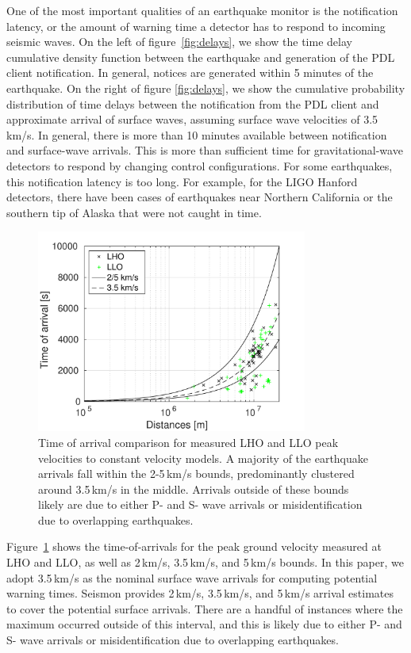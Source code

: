 \documentclass[twocolumn, aps, superscriptaddress]{revtex4}
\begin{document}
One of the most important qualities of an earthquake monitor is the notification latency, or the amount of warning time a detector has to respond to incoming seismic waves. On the left of figure~\ref{fig:delays}, we show the time delay cumulative density function between the earthquake and generation of the PDL client notification. In general, notices are generated within 5 minutes of the earthquake. On the right of figure \ref{fig:delays}, we show the cumulative probability distribution of time delays between the notification from the PDL client and approximate arrival of surface waves, assuming surface wave velocities of 3.5\,km/s. In general, there is more than 10 minutes available between notification and surface-wave arrivals. This is more than sufficient time for gravitational-wave detectors to respond by changing control configurations. For some earthquakes, this notification latency is too long. For example, for the LIGO Hanford detectors, there have been cases of earthquakes near Northern California or the southern tip of Alaska that were not caught in time.

\begin{figure}[t]
\hspace*{-0.5cm}
 \includegraphics[width=3.5in]{TOA.pdf}
 \caption{Time of arrival comparison for measured LHO and LLO peak velocities to constant velocity models. A majority of the earthquake arrivals fall within the 2-5\,km/s bounds, predominantly clustered around 3.5\,km/s in the middle. Arrivals outside of these bounds likely are due to either P- and S- wave arrivals or misidentification due to overlapping earthquakes.}
 \label{fig:TOA}
\end{figure}

Figure~\ref{fig:TOA} shows the time-of-arrivals for the peak ground velocity measured at LHO and LLO, as well as 2\,km/s, 3.5\,km/s, and 5\,km/s bounds. In this paper, we adopt 3.5\,km/s as the nominal surface wave arrivals for computing potential warning times. Seismon provides 2\,km/s, 3.5\,km/s, and 5\,km/s arrival estimates to cover the potential surface arrivals. There are a handful of instances where the maximum occurred outside of this interval, and this is likely due to either P- and S- wave arrivals or misidentification due to overlapping earthquakes.
\end{document}
